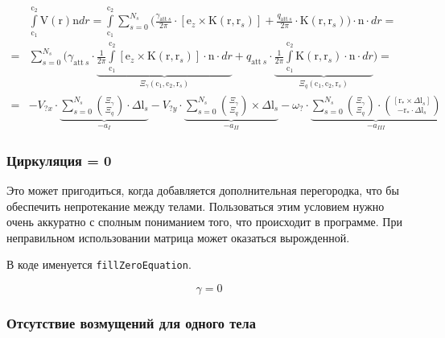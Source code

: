 \documentclass[a4paper,14pt]{extreport}
\newcommand{\br}[1]{\boldsymbol{\mathrm{#1}}}
\renewcommand{\vec}[1]{\br{#1}}
\newcommand{\att}{\text{att}}
\begin{document}
\begin{equation}
\begin{split}
&\int\limits_{\vec c_1}^{\vec c_2} {\vec V(\vec r)\vec n dr}
= \int\limits_{\vec c_1}^{\vec c_2} {
	\sum\limits_{s=0}^{N_s} {
		\biggl (
		\frac{\gamma_{\att~s}}{2\pi} \cdot [\vec e_z \times \vec K(\vec r, \vec r_s)] +
		\frac{q_{\att~s}}{2\pi} \cdot \vec K(\vec r, \vec r_s)
		\biggr )
	}
	\cdot \vec n \cdot  dr
} = \\ =
&\sum\limits_{s=0}^{N_s} {
	\biggl (
	\gamma_{\att~s} \cdot 
	\underbrace{
	\frac{1}{2\pi}
	\int\limits_{\vec c_1}^{\vec c_2} {
		[\vec e_z \times \vec K(\vec r, \vec r_s)] \cdot \vec n \cdot dr
	}}_{\Xi_\gamma(\vec c_1, \vec c_2, \vec r_s)} + 
	q_{\att~s} \cdot
	\underbrace{
	\frac{1}{2\pi}
	\int\limits_{\vec c_1}^{\vec c_2} {
		\vec K(\vec r, \vec r_s) \cdot \vec n \cdot dr
	}}_{\Xi_q(\vec c_1, \vec c_2, \vec r_s)}
	\biggr )
} = \\ =
&-V_{?x} \cdot \underbrace{
	\sum\limits_{s=0}^{N_s} {\binom{\Xi_\gamma}{\Xi_q} \cdot \Delta \vec l_s}
}_{-a_I}
-V_{?y} \cdot \underbrace{
	\sum\limits_{s=0}^{N_s} {\binom{\Xi_\gamma}{\Xi_q} \times \Delta \vec l_s}
}_{-a_{II}}
-\omega_? \cdot \underbrace{
	\sum\limits_{s=0}^{N_s} {\binom{\Xi_\gamma}{\Xi_q} \cdot \binom{[\vec r_* \times \Delta \vec l_s]}{-\vec r_* \cdot \Delta \vec l_s}}
}_{-a_{III}}
\end{split}
\end{equation}

\subsubsection{Циркуляция = 0}
\label{slau_zero}

Это может пригодиться, когда добавляется дополнительная перегородка, что бы обеспечить непротекание между телами.
Пользоваться этим условием нужно очень аккуратно с сполным пониманием того, что происходит в программе. При неправильном использовании матрица может оказаться вырожденной.

В коде именуется \texttt{fillZeroEquation}.

\begin{equation}
\gamma = 0
\end{equation}

\subsubsection{Отсутствие возмущений для одного тела}
\label{slau_steady}
\end{document}
